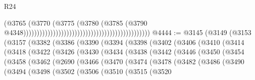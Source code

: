 \begin{lexlean}{R24}
\begin{coremodule}
                                                                                      (@3765
                                                                                        (@3770
                                                                                          (@3775
                                                                                            (@3780
                                                                                              (@3785
                                                                                                (@3790
                                                                                                  @4348)))))))))))))))))))))))))))))))))))))))))))))))
@4444 := @3145
    (@3149
      (@3153
        (@3157
          (@3382
            (@3386
              (@3390
                (@3394
                  (@3398
                    (@3402
                      (@3406
                        (@3410
                          (@3414
                            (@3418
                              (@3422
                                (@3426
                                  (@3430
                                    (@3434
                                      (@3438
                                        (@3442
                                          (@3446
                                            (@3450
                                              (@3454
                                                (@3458
                                                  (@3462
                                                    (@2690
                                                      (@3466
                                                        (@3470
                                                          (@3474
                                                            (@3478
                                                              (@3482
                                                                (@3486
                                                                  (@3490
                                                                    (@3494
                                                                      (@3498
                                                                        (@3502
                                                                          (@3506
                                                                            (@3510
                                                                              (@3515
                                                                                (@3520

\end{coremodule}
\end{lexlean}

